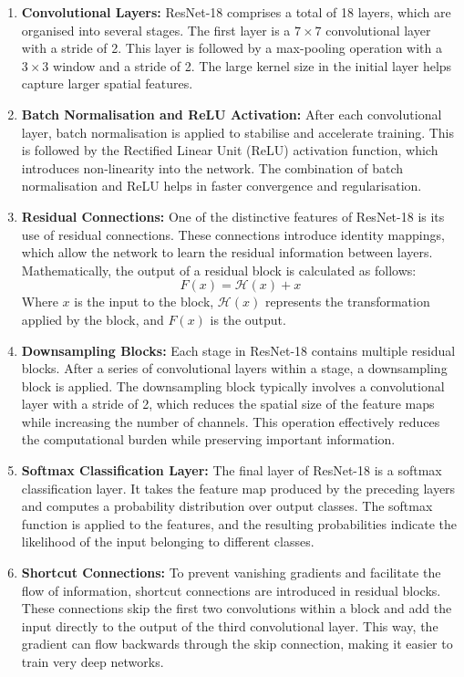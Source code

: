 \begin{enumerate}
\item \textbf{Convolutional Layers:} ResNet-18 comprises a total of 18 layers, which are organised into several stages. The first layer is a $7\times7$ convolutional layer with a stride of 2. This layer is followed by a max-pooling operation with a $3\times3$ window and a stride of 2. The large kernel size in the initial layer helps capture larger spatial features.

\item \textbf{Batch Normalisation and ReLU Activation:} After each convolutional layer, batch normalisation is applied to stabilise and accelerate training. This is followed by the Rectified Linear Unit (ReLU) activation function, which introduces non-linearity into the network. The combination of batch normalisation and ReLU helps in faster convergence and regularisation.

\item \textbf{Residual Connections:} One of the distinctive features of ResNet-18 is its use of residual connections. These connections introduce identity mappings, which allow the network to learn the residual information between layers. Mathematically, the output of a residual block is calculated as follows:
\begin{equation}
F(x) = \mathcal{H}(x) + x
\end{equation}
Where \(x\) is the input to the block, \(\mathcal{H}(x)\) represents the transformation applied by the block, and \(F(x)\) is the output.

\item \textbf{Downsampling Blocks:} Each stage in ResNet-18 contains multiple residual blocks. After a series of convolutional layers within a stage, a downsampling block is applied. The downsampling block typically involves a convolutional layer with a stride of 2, which reduces the spatial size of the feature maps while increasing the number of channels. This operation effectively reduces the computational burden while preserving important information.

\item \textbf{Softmax Classification Layer:} The final layer of ResNet-18 is a softmax classification layer. It takes the feature map produced by the preceding layers and computes a probability distribution over output classes. The softmax function is applied to the features, and the resulting probabilities indicate the likelihood of the input belonging to different classes.

\item \textbf{Shortcut Connections:} To prevent vanishing gradients and facilitate the flow of information, shortcut connections are introduced in residual blocks. These connections skip the first two convolutions within a block and add the input directly to the output of the third convolutional layer. This way, the gradient can flow backwards through the skip connection, making it easier to train very deep networks.
\end{enumerate}


